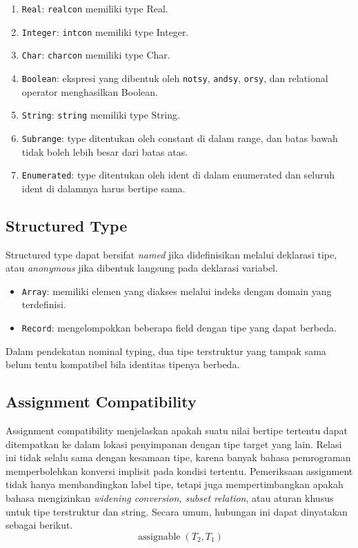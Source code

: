 \begin{enumerate}
    \item \texttt{Real}: \texttt{realcon} memiliki type Real.
    \item \texttt{Integer}: \texttt{intcon} memiliki type Integer.
    \item \texttt{Char}: \texttt{charcon} memiliki type Char.
    \item \texttt{Boolean}: ekspresi yang dibentuk oleh \texttt{notsy}, \texttt{andsy}, \texttt{orsy}, dan relational operator menghasilkan Boolean.
    \item \texttt{String}: \texttt{string} memiliki type String.
    \item \texttt{Subrange}: type ditentukan oleh constant di dalam range, dan batas bawah tidak boleh lebih besar dari batas atas.
    \item \texttt{Enumerated}: type ditentukan oleh ident di dalam enumerated dan seluruh ident di dalamnya harus bertipe sama.
\end{enumerate}

\subsection{Structured Type}
Structured type dapat bersifat \textit{named} jika didefinisikan melalui deklarasi tipe, atau \textit{anonymous} jika dibentuk langsung pada deklarasi variabel.

\begin{itemize}
    \item \texttt{Array}: memiliki elemen yang diakses melalui indeks dengan domain yang terdefinisi.
    \item \texttt{Record}: mengelompokkan beberapa field dengan tipe yang dapat berbeda.
\end{itemize}

Dalam pendekatan nominal typing, dua tipe terstruktur yang tampak sama belum tentu kompatibel bila identitas tipenya berbeda.

\subsection{Assignment Compatibility}
Assignment compatibility menjelaskan apakah suatu nilai bertipe tertentu dapat ditempatkan ke dalam lokasi penyimpanan dengan tipe target yang lain. Relasi ini tidak selalu sama dengan kesamaan tipe, karena banyak bahasa pemrograman memperbolehkan konversi implisit pada kondisi tertentu. Pemeriksaan assignment tidak hanya membandingkan label tipe, tetapi juga mempertimbangkan apakah bahasa mengizinkan \textit{widening conversion, subset relation}, atau aturan khusus untuk tipe terstruktur dan string. Secara umum, hubungan ini dapat dinyatakan sebagai berikut.
$$
    \operatorname{assignable}(T_2, T_1)
$$

